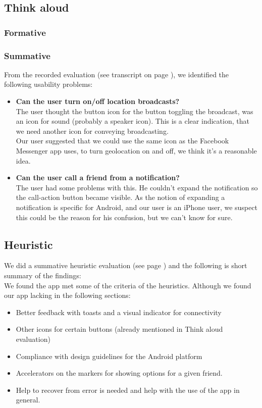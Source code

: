 \documentclass[runningheads,a4paper]{llncs}
\begin{document}
\subsection*{Think aloud}

\subsubsection*{Formative}


\subsubsection*{Summative}

From the recorded evaluation (see transcript on page \pageref{transcript}), we identified the following usability problems:

\begin{itemize}
\item \textbf{Can the user turn on/off location broadcasts?}\\
	The user thought the button icon for the button toggling the broadcast, was an icon for sound (probably a speaker icon). This is a clear indication, that we need another icon for conveying broadcasting. \\
	Our user suggested that we could use the same icon as the Facebook Messenger app uses, to turn geolocation on and off, we think it's a reasonable idea. 
\item \textbf{Can the user call a friend from a notification?}\\
	The user had some problems with this. He couldn't expand the notification so the call-action button became visible. 
As the notion of expanding a notification is specific for Android, and our user is an iPhone user, we suspect this could be the reason for his confusion, but we can't know for sure.
\end{itemize}

\subsection*{Heuristic}
We did a summative heuristic evaluation (see page \pageref{heuristic}) and the following is short summary of the findings: \\

We found the app met some of the criteria of the heuristics. Although we found our app lacking in the following sections:
\begin{itemize}
\item Better feedback with toasts and a visual indicator for connectivity
\item Other icons for certain buttons (already mentioned in Think aloud evaluation)
\item Compliance with design guidelines for the Android platform
\item Accelerators on the markers for showing options for a given friend.
\item Help to recover from error is needed and help with the use of the app in general.
\end{itemize}
\end{document}
